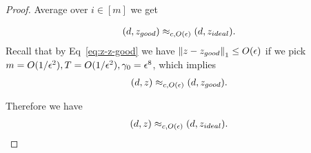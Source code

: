 \begin{proof}

	Average over $i\in[m]$ we get

	\begin{align}
		(d,z_{good})\approx_{c, O(\epsilon)}(d,z_{ideal}).
	\end{align}
	Recall that by Eq~\ref{eq:z-z-good} we have $\left\lVert z-z_{good}\right\rVert_1 \leq O(\epsilon)$ if we pick $m=O(1/\epsilon^2), T=O(1/\epsilon^2),\gamma_0=\epsilon^8$, which implies
	\begin{align}
		(d,z)\approx_{c, O(\epsilon)}(d,z_{good}).
	\end{align}

	Therefore  we have  
	\begin{align}
		(d,z)\approx_{c, O(\epsilon)}(d,z_{ideal}).
	\end{align}
\end{proof}
